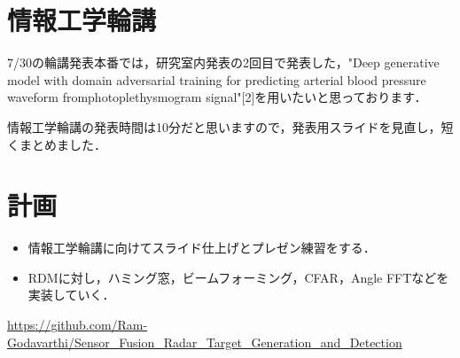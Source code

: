 \documentclass[dvipdfmx]{jsarticle}
\begin{document}
\section{情報工学輪講}
7/30の輪講発表本番では，研究室内発表の2回目で発表した，"Deep generative model with domain adversarial training for predicting arterial blood pressure waveform fromphotoplethysmogram signal"[2]を用いたいと思っております．

情報工学輪講の発表時間は10分だと思いますので，発表用スライドを見直し，短くまとめました．

\section{計画}
\begin{itemize}
    \item 情報工学輪講に向けてスライド仕上げとプレゼン練習をする．
    \item RDMに対し，ハミング窓，ビームフォーミング，CFAR，Angle FFTなどを実装していく．
\end{itemize}

\begin{thebibliography}{}
\item \url{https://github.com/Ram-Godavarthi/Sensor_Fusion_Radar_Target_Generation_and_Detection}
\end{thebibliography}
\end{document}
